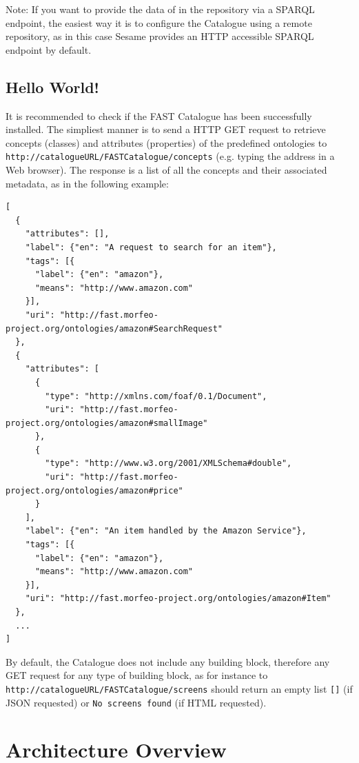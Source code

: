 \documentclass{fast_latex}
\begin{document}
Note: If you want to provide the data of in the repository via a SPARQL endpoint, the easiest way it is to configure the Catalogue using a remote repository, as in this case Sesame provides an HTTP accessible SPARQL endpoint by default.



\subsection{Hello World!} %
\label{sub:hello_world}

It is recommended to check if the FAST Catalogue has been successfully installed. The simpliest manner is to send a HTTP GET request to retrieve concepts (classes) and attributes (properties) of the predefined ontologies to \verb|http://catalogueURL/FASTCatalogue/concepts| (e.g. typing the address in a Web browser). The response is a list of all the concepts and their associated metadata, as in the following example:

\singlespacing
\begin{verbatim}
[
  {
    "attributes": [],
    "label": {"en": "A request to search for an item"},
    "tags": [{
      "label": {"en": "amazon"},
      "means": "http://www.amazon.com"
    }],
    "uri": "http://fast.morfeo-project.org/ontologies/amazon#SearchRequest"
  },
  {
    "attributes": [
      {
        "type": "http://xmlns.com/foaf/0.1/Document",
        "uri": "http://fast.morfeo-project.org/ontologies/amazon#smallImage"
      },
      {
        "type": "http://www.w3.org/2001/XMLSchema#double",
        "uri": "http://fast.morfeo-project.org/ontologies/amazon#price"
      }
    ],
    "label": {"en": "An item handled by the Amazon Service"},
    "tags": [{
      "label": {"en": "amazon"},
      "means": "http://www.amazon.com"
    }],
    "uri": "http://fast.morfeo-project.org/ontologies/amazon#Item"
  },
  ...
]
\end{verbatim}
\doublespacing

By default, the Catalogue does not include any building block, therefore any GET request for any type of building block, as for instance to \verb|http://catalogueURL/FASTCatalogue/screens| should return an empty list \verb|[]| (if JSON requested) or \verb|No screens found| (if HTML requested).




\clearpage
\section{Architecture Overview} %
\label{sec:architecture_overview}
\end{document}
